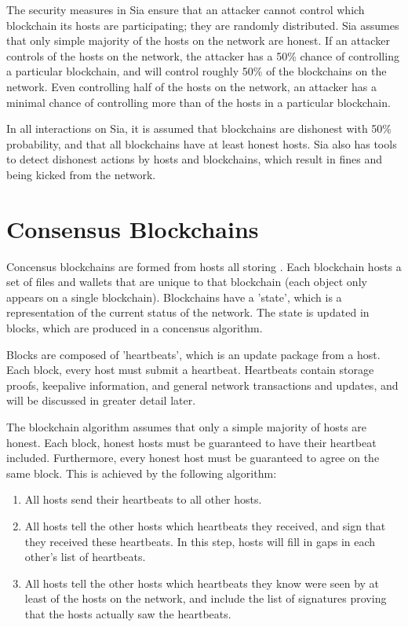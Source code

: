 \documentclass[twocolumn]{article}
\begin{document}
The security measures in Sia ensure that an attacker cannot control which blockchain its hosts are participating; they are randomly distributed.
Sia assumes that only simple majority of the hosts on the network are honest.
If an attacker controls \fortynine{} of the hosts on the network, the attacker has a 50\% chance of controlling a particular blockchain, and will control roughly 50\% of the blockchains on the network.
Even controlling half of the hosts on the network, an attacker has a minimal chance of controlling more than \maxcorruption{} of the hosts in a particular blockchain.

In all interactions on Sia, it is assumed that blockchains are dishonest with 50\% probability, and that all blockchains have at least \inversemaxcorruption{} honest hosts.
Sia also has tools to detect dishonest actions by hosts and blockchains, which result in fines and being kicked from the network.

\section{Consensus Blockchains}

Concensus blockchains are formed from \numhosts{} hosts all storing \storageperhost{}.
Each blockchain hosts a set of files and wallets that are unique to that blockchain (each object only appears on a single blockchain).
Blockchains have a 'state', which is a representation of the current status of the network.
The state is updated in blocks, which are produced in a concensus algorithm.

Blocks are composed of 'heartbeats', which is an update package from a host.
Each block, every host must submit a heartbeat.
Heartbeats contain storage proofs, keepalive information, and general network transactions and updates, and will be discussed in greater detail later.

The blockchain algorithm assumes that only a simple majority of hosts are honest.
Each block, honest hosts must be guaranteed to have their heartbeat included.
Furthermore, every honest host must be guaranteed to agree on the same block.
This is achieved by the following algorithm:

\begin{enumerate}
	\item All hosts send their heartbeats to all other hosts.
	\item All hosts tell the other hosts which heartbeats they received, and sign that they received these heartbeats.
	In this step, hosts will fill in gaps in each other's list of heartbeats.
	\item All hosts tell the other hosts which heartbeats they know were seen by at least \fiftyone{} of the hosts on the network, and include the list of signatures proving that the hosts actually saw the heartbeats.
\end{enumerate}
\end{document}
